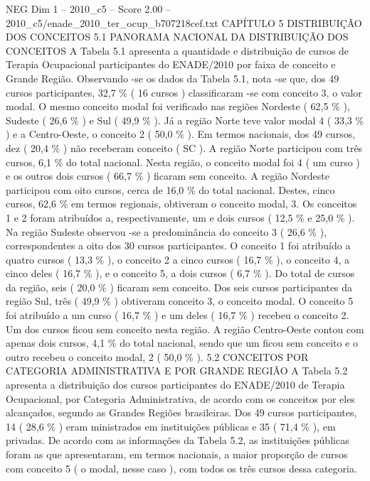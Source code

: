 \begin{textsample}{NEG Dim 1 – 2010\_c5 – Score 2.00 – 2010\_c5/enade\_2010\_ter\_ocup\_b707218cef.txt}  \label{ex:f1_neg_304}
CAPÍTULO 5 DISTRIBUIÇÃO DOS CONCEITOS 5.1 PANORAMA NACIONAL DA DISTRIBUIÇÃO DOS CONCEITOS A Tabela 5.1 apresenta a quantidade e distribuição de cursos de Terapia Ocupacional participantes do ENADE/2010 por faixa de conceito e Grande Região.
Observando -se os dados da Tabela 5.1, nota -se que, dos 49 cursos participantes, 32,7 \% ( 16 cursos ) classificaram -se com conceito 3, o valor modal.
O mesmo conceito modal foi verificado nas regiões Nordeste ( 62,5 \% ), Sudeste ( 26,6 \% ) e Sul ( 49,9 \% ).
Já a região Norte teve valor modal 4 ( 33,3 \% ) e a Centro-Oeste, o conceito 2 ( 50,0 \% ).
Em termos nacionais, dos 49 cursos, dez ( 20,4 \% ) não receberam conceito ( SC ).
A região Norte participou com três cursos, 6,1 \% do total nacional.
Nesta região, o conceito modal foi 4 ( um curso ) e os outros dois cursos ( 66,7 \% ) ficaram sem conceito.
A região Nordeste participou com oito cursos, cerca de 16,0 \% do total nacional.
Destes, cinco cursos, 62,6 \% em termos regionais, obtiveram o conceito modal, 3.
Os conceitos 1 e 2 foram atribuídos a, respectivamente, um e dois cursos ( 12,5 \% e 25,0 \% ).
Na região Sudeste observou -se a predominância do conceito 3 ( 26,6 \% ), correspondentes a oito dos 30 cursos participantes.
O conceito 1 foi atribuído a quatro cursos ( 13,3 \% ), o conceito 2 a cinco cursos ( 16,7 \% ), o conceito 4, a cinco deles ( 16,7 \% ), e o conceito 5, a dois cursos ( 6,7 \% ).
Do total de cursos da região, seis ( 20,0 \% ) ficaram sem conceito.
Dos seis cursos participantes da região Sul, três ( 49,9 \% ) obtiveram conceito 3, o conceito modal.
O conceito 5 foi atribuído a um curso ( 16,7 \% ) e um deles ( 16,7 \% ) recebeu o conceito 2.
Um dos cursos ficou sem conceito nesta região.
A região Centro-Oeste contou com apenas dois cursos, 4,1 \% do total nacional, sendo que um ficou sem conceito e o outro recebeu o conceito modal, 2 ( 50,0 \% ). 5.2 CONCEITOS POR CATEGORIA ADMINISTRATIVA E POR GRANDE REGIÃO A Tabela 5.2 apresenta a distribuição dos cursos participantes do ENADE/2010 de Terapia Ocupacional, por Categoria Administrativa, de acordo com os conceitos por eles alcançados, segundo as Grandes Regiões brasileiras.
Dos 49 cursos participantes, 14 ( 28,6 \% ) eram ministrados em instituições públicas e 35 ( 71,4 \% ), em privadas.
De acordo com as informações da Tabela 5.2, as instituições públicas foram as que apresentaram, em termos nacionais, a maior proporção de cursos com conceito 5 ( o modal, nesse caso ), com todos os três cursos dessa categoria.

\end{textsample}
